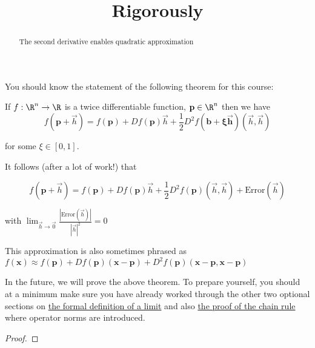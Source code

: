 \documentclass{ximera}
\title{Rigorously}
\begin{document}
	\begin{abstract}
		The second derivative enables quadratic approximation
	\end{abstract}
	
	You should know the statement of the following theorem for this course:
	
	\begin{theorem}
		If $f:\R^n \to \R$ is a twice differentiable function, $\mathbf{p} \in \R^n$ then we have
		\[
			f(\mathbf{p} + \vec{h}) = f(\mathbf{p})+ Df(\mathbf{p})\vec{h}+\frac{1}{2}D^2f(\mathbf{b+\xi\vec{h}})(\vec{h},\vec{h})
		\]
		
		for some $\xi \in [0,1]$.
		
		It follows (after a lot of work!) that
		
		\[
			f(\mathbf{p} + \vec{h}) = f(\mathbf{p})+ Df(\mathbf{p})\vec{h}+\frac{1}{2}D^2f(\mathbf{p})(\vec{h},\vec{h})+ \textrm{Error}(\vec{h})
		\]
		
		with $\displaystyle\lim_{\vec{h} \to \vec{0}} \frac{|\textrm{Error}(\vec{h})|}{|\vec{h}|^2} = 0$
	\end{theorem}
	
	This approximation is also sometimes phrased as 
	$f(\mathbf{x}) \approx f(\mathbf{p}) + Df(\mathbf{p})(\mathbf{x}-\mathbf{p})+D^2f(\mathbf{p})(\mathbf{x}-\mathbf{p},\mathbf{x}-\mathbf{p})$
	
	In the future, we will prove the above theorem. 	To prepare yourself, you should at a minimum make sure you have already worked through 
	the other two optional sections on \href{http://ximera.osu.edu/course/kisonecat/m2o2c2/course/activity/week2/limits/formal-limit/}{the formal definition of a limit} 
	and also \href{http://ximera.osu.edu/course/kisonecat/m2o2c2/course/activity/week2/chain-rule/proof/}{ the proof of the chain rule} where operator norms are introduced.
	
	\begin{proof}
	\end{proof}

	
	
\end{document}

